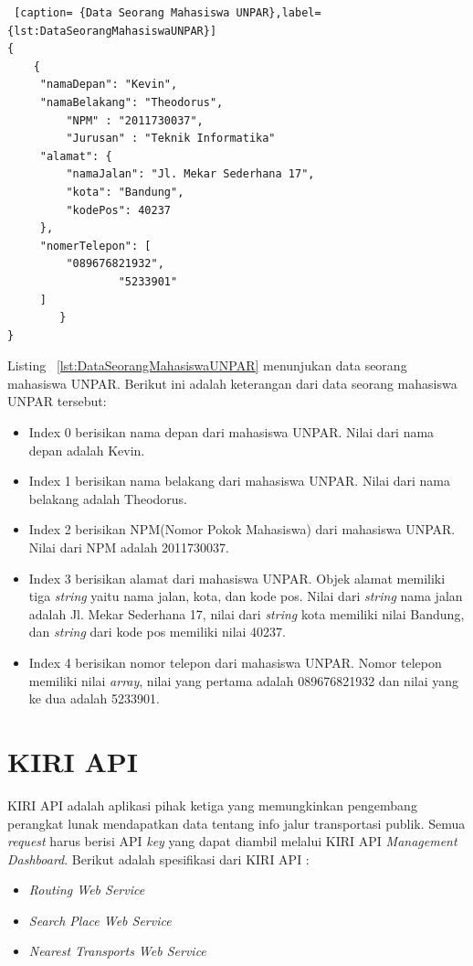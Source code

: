 \begin{lstlisting} [caption= {Data Seorang Mahasiswa UNPAR},label={lst:DataSeorangMahasiswaUNPAR}]
{ 
    {
     "namaDepan": "Kevin",
     "namaBelakang": "Theodorus",
		 "NPM" : "2011730037",
		 "Jurusan" : "Teknik Informatika"
     "alamat": {
         "namaJalan": "Jl. Mekar Sederhana 17",
         "kota": "Bandung",
         "kodePos": 40237
     },
     "nomerTelepon": [ 
         "089676821932",
				 "5233901"
     ]
		}
}
\end{lstlisting} 
Listing ~\ref{lst:DataSeorangMahasiswaUNPAR} menunjukan data seorang mahasiswa UNPAR. Berikut ini adalah keterangan dari data seorang mahasiswa UNPAR tersebut:
\begin{itemize}
	\item Index 0 berisikan nama depan dari mahasiswa UNPAR. Nilai dari nama depan adalah Kevin.
	\item Index 1 berisikan nama belakang dari mahasiswa UNPAR. Nilai dari nama belakang adalah Theodorus.
	\item Index 2 berisikan NPM(Nomor Pokok Mahasiswa) dari mahasiswa UNPAR. Nilai dari NPM adalah 2011730037.
	\item Index 3 berisikan alamat dari mahasiswa UNPAR. Objek alamat memiliki tiga \textit{string} yaitu nama jalan, kota, dan kode pos. Nilai dari \textit{string} nama jalan adalah Jl. Mekar Sederhana 17, nilai dari \textit{string} kota memiliki nilai Bandung, dan \textit{string} dari kode pos memiliki nilai 40237.
	\item Index 4 berisikan nomor telepon dari mahasiswa UNPAR. Nomor telepon memiliki nilai \textit{array}, nilai yang pertama adalah 089676821932 dan nilai yang ke dua adalah 5233901.
\end{itemize}

\section{KIRI API\cite{Kiri}}
KIRI API adalah aplikasi pihak ketiga yang memungkinkan pengembang perangkat lunak mendapatkan data tentang info jalur transportasi publik. Semua \textit{request} harus berisi API \textit{key} yang dapat diambil melalui KIRI API \textit{Management Dashboard}. Berikut adalah spesifikasi dari KIRI API :

\begin{itemize}
	\item \textit{Routing Web Service}
	\item \textit{Search Place Web Service}
	\item \textit{Nearest Transports Web Service}
\end{itemize}


